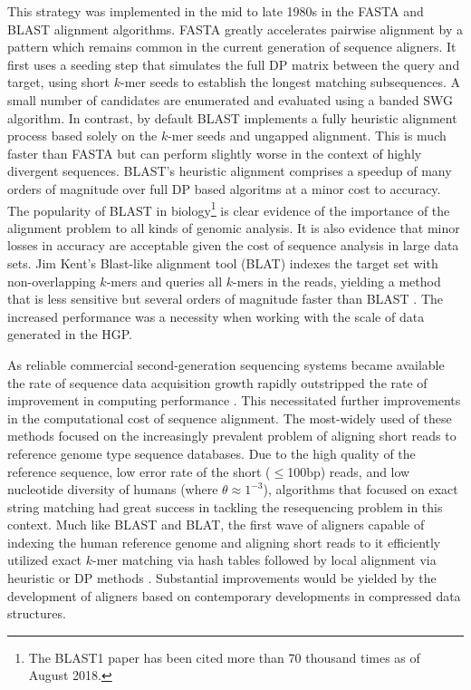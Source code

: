 This strategy was implemented in the mid to late 1980s in the FASTA \cite{pearson1988improved} and BLAST \cite{altschul1990basic} alignment algorithms.
FASTA greatly accelerates pairwise alignment by a pattern which remains common in the current generation of sequence aligners.
It first uses a seeding step that simulates the full DP matrix between the query and target, using short $k$-mer seeds to establish the longest matching subsequences.
A small number of candidates are enumerated and evaluated using a banded SWG algorithm.
In contrast, by default BLAST implements a fully heuristic alignment process based solely on the $k$-mer seeds and ungapped alignment.
This is much faster than FASTA but can perform slightly worse in the context of highly divergent sequences.
BLAST's heuristic alignment comprises a speedup of many orders of magnitude over full DP based algoritms at a minor cost to accuracy.
The popularity of BLAST in biology\footnote{The BLAST1 paper has been cited more than 70 thousand times as of August 2018.} is clear evidence of the importance of the alignment problem to all kinds of genomic analysis.
It is also evidence that minor losses in accuracy are acceptable given the cost of sequence analysis in large data sets.
Jim Kent's Blast-like alignment tool (BLAT) indexes the target set with non-overlapping $k$-mers and queries all $k$-mers in the reads, yielding a method that is less sensitive but several orders of magnitude faster than BLAST \cite{kent2002blat}.
The increased performance was a necessity when working with the scale of data generated in the HGP.

As reliable commercial second-generation sequencing systems became available the rate of sequence data acquisition growth rapidly outstripped the rate of improvement in computing performance \cite{leinonen2010sequence,kodama2011sequence}.
This necessitated further improvements in the computational cost of sequence alignment.
The most-widely used of these methods focused on the increasingly prevalent problem of aligning short reads to reference genome type sequence databases.
Due to the high quality of the reference sequence, low error rate of the short ($\leq$100bp) reads, and low nucleotide diversity of humans (where $\theta \approx 1^{-3}$), algorithms that focused on exact string matching had great success in tackling the resequencing problem in this context.
Much like BLAST and BLAT, the first wave of aligners capable of indexing the human reference genome and aligning short reads to it efficiently utilized exact $k$-mer matching via hash tables followed by local alignment via heuristic or DP methods \cite{li2008soap,lee2014mosaik,li2008mapping}.
Substantial improvements would be yielded by the development of aligners based on contemporary developments in compressed data structures.

